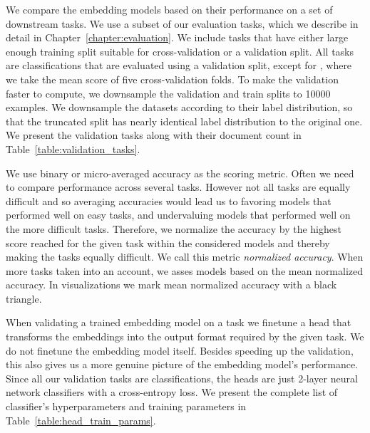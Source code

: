 We compare the embedding models based on their performance on a set of
downstream tasks. We use a subset of our evaluation tasks, which we describe in
detail in Chapter~\ref{chapter:evaluation}. We include tasks that have either
large enough training split suitable for cross-validation or a validation
split. All tasks are classifications that are evaluated using a validation
split, except for , where we take the mean score of five
cross-validation folds. To make the validation faster to compute, we downsample
the validation and train splits to 10000 examples. We downsample the datasets
according to their label distribution, so that the truncated split has nearly
identical label distribution to the original one. We present the validation
tasks along with their document count in Table~\ref{table:validation_tasks}.

We use binary or micro-averaged accuracy as the scoring metric. Often we need
to compare performance across several tasks. However not all tasks are equally
difficult and so averaging accuracies would lead us to favoring models that
performed well on easy tasks, and undervaluing models that performed well on
the more difficult tasks. Therefore, we normalize the accuracy by the highest
score reached for the given task within the considered models and thereby
making the tasks equally difficult. We call this metric \emph{normalized
accuracy}. When more tasks taken into an account, we asses models based on the
mean normalized accuracy. In visualizations we mark mean normalized accuracy
with a black triangle.

When validating a trained embedding model on a task we finetune a head that
transforms the embeddings into the output format required by the given task. We
do not finetune the embedding model itself. Besides speeding up the validation,
this also gives us a more genuine picture of the embedding model's performance.
Since all our validation tasks are classifications, the heads are just 2-layer
neural network classifiers with a cross-entropy loss. We present the complete
list of classifier's hyperparameters and training parameters in
Table~\ref{table:head_train_params}.

